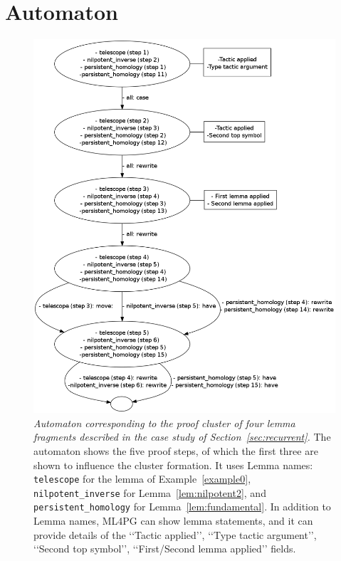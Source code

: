 \newpage




\section{Automaton}\label{sec:automaton} 
 
 

\begin{figure}[h]
    \centering
\includegraphics[scale=0.28]{itp.png} 
\caption{\scriptsize{\emph{Automaton corresponding to the proof cluster of four lemma fragments described in the case study of Section~\ref{sec:recurrent}.} The automaton shows the five proof steps, of which the first three are shown to influence the cluster formation.
It uses Lemma names: \texttt{telescope} for the lemma of Example~\ref{example0}, \texttt{nilpotent\_inverse} for Lemma~\ref{lem:nilpotent2}, and \texttt{persistent\_homology} 
for Lemma~\ref{lem:fundamental}.
  In addition to Lemma names, ML4PG can show lemma statements, and it can provide details of the \lq\lq{}Tactic applied\rq\rq{}, \lq\lq{}Type tactic argument\rq\rq{}, \lq\lq{}Second top symbol\rq\rq{}, \lq\lq{}First/Second lemma applied\rq\rq{} fields.}}
\end{figure}




